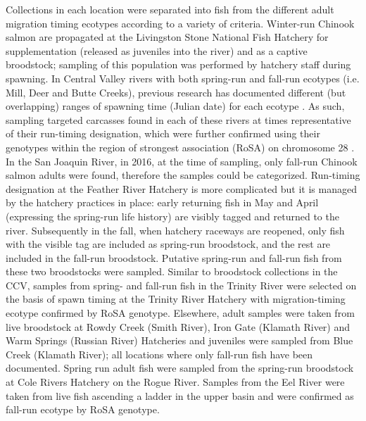 Collections in each location were separated into fish from the different adult migration timing ecotypes according
to a variety of criteria.  Winter-run Chinook salmon are propagated at the Livingston
Stone National Fish Hatchery for supplementation (released as juveniles into the river) and as a captive broodstock;
sampling of this population was performed by hatchery staff during spawning. In Central Valley rivers with both
spring-run and fall-run ecotypes (i.e. Mill, Deer and Butte Creeks), previous research has documented different  (but overlapping) ranges of spawning time (Julian date) for each ecotype \citep{fry1961king,yoshiyama1998historical}.
As such, sampling targeted carcasses found in each of these
rivers at times representative of their run-timing designation, which were further confirmed using their genotypes
within the region of strongest association (RoSA) on chromosome 28 \citep{thompson2020complex}.
In the San Joaquin River, in 2016, at the time of sampling, only
fall-run Chinook salmon adults were found, therefore the samples could be categorized.  Run-timing
designation at the Feather River Hatchery is more complicated but it is managed by the hatchery practices in place:
early returning fish in May and April (expressing the spring-run life history) are visibly tagged and returned
to the river. Subsequently in the fall, when hatchery raceways are reopened, only fish with the visible tag are included
as spring-run broodstock, and the rest are included in the fall-run broodstock.
Putative spring-run and fall-run fish 
from these two broodstocks were sampled. Similar to broodstock collections in the CCV, samples from spring- and fall-run fish in the Trinity River were selected on the basis of spawn timing at the Trinity River Hatchery with migration-timing ecotype confirmed by RoSA genotype. Elsewhere, adult samples were taken from live broodstock at Rowdy Creek (Smith River), Iron Gate (Klamath River) and Warm Springs (Russian River) Hatcheries and juveniles were sampled from Blue Creek (Klamath River); all locations where only fall-run fish have been documented.  Spring run adult fish were sampled from the spring-run broodstock at Cole Rivers Hatchery on the Rogue River. Samples from the Eel River were taken from live fish ascending a ladder in the upper basin and were confirmed as fall-run ecotype by RoSA genotype. 



